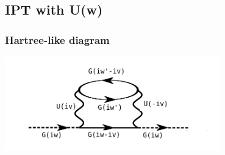 \documentclass[12pt,a4paper]{scrartcl}
\numberwithin{equation}{section}
\begin{document}
\subsection{IPT with U(w)}
\subsubsection{Hartree-like diagram}
\begin{center}
\includegraphics[width=0.7\textwidth]{figs/ipt/diag2_1.png}
\end{center}
\end{document}

